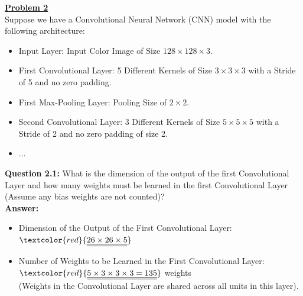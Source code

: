 \documentclass{book}
\begin{document}
\vspace{3mm}
\uline{\textbf{Problem 2}}\\
Suppose we have a Convolutional Neural Network (CNN) model with the following architecture:
\begin{itemize}
    \item Input Layer: Input Color Image of Size $128 \times 128 \times 3$.
    \item First Convolutional Layer: 5 Different Kernels of Size $3 \times 3 \times 3$ with a Stride of 5 and no zero padding.
    \item First Max-Pooling Layer: Pooling Size of $2 \times 2$.
    \item Second Convolutional Layer: 3 Different Kernels of Size $5 \times 5 \times 5$ with a Stride of 2 and no zero padding of size 2.
    \item $\ldots$
\end{itemize}
\textbf{Question 2.1:} What is the dimension of the output of the first Convolutional Layer and how many weights must be learned in the first Convolutional Layer (Assume any bias weights are not counted)?\\
\textbf{Answer:}\\
\begin{itemize}
    \item Dimension of the Output of the First Convolutional Layer: $\textcolor{red}{\underline{\underline{26 \times 26 \times 5}}}$\\
    \item Number of Weights to be Learned in the First Convolutional Layer: $\textcolor{red}{\underline{\underline{5 \times 3 \times 3 \times 3 = 135}}}$ weights\\
    (Weights in the Convolutional Layer are shared across all units in this layer).\\
\end{itemize}
\end{document}
